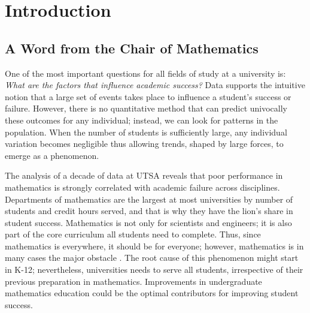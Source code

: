 ﻿%
\chapter{Introduction}  \newpage


\section{A Word from the Chair of Mathematics}

\vspace{0.5in}

One of the most important questions for all fields of study at a university is: \textit{What are the factors that influence academic success?} Data supports the intuitive notion that a large set of events takes place to influence a student's success or failure. However, there is no quantitative method that can predict univocally these outcomes for any individual; instead, we can look for patterns in the population. When the number of students is sufficiently large, any individual variation becomes negligible thus allowing trends, shaped by large forces, to emerge as a phenomenon.

The analysis of a decade of data at UTSA reveals that poor performance in mathematics is strongly correlated with academic failure across disciplines. Departments of mathematics are the largest at most universities by number of students and credit hours served, and that is why they have the lion's share in student success. Mathematics is not only for scientists and engineers; it is also part of the core curriculum all students need to complete. Thus, since mathematics is everywhere, it should be for everyone; however, mathematics is in many cases the major obstacle . The root cause of this phenomenon might start in K-12; nevertheless, universities needs to serve all students, irrespective of their previous preparation in mathematics. Improvements in undergraduate mathematics education could be the optimal contributors for improving student success.  

